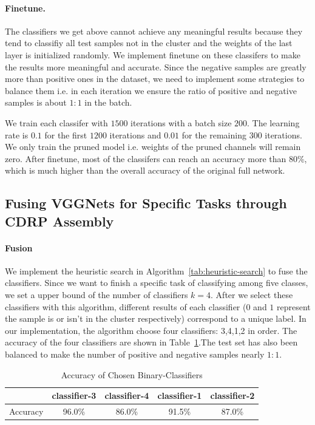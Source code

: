 \documentclass[sigplan,10pt,review]{acmart}\settopmatter{printfolios=true,printccs=false,printacmref=false}
\begin{document}
\paragraph{Finetune.} The classifiers we get above cannot achieve any meaningful results because they tend to classifiy all test samples not in the cluster and the weights of the last layer is initialized randomly.
We implement finetune on these classifers to make the results more meaningful and accurate. 
Since the negative samples are greatly more than positive ones in the dataset, we need to implement some strategies to balance them i.e. in each iteration we ensure the ratio of positive and negative samples is about $1:1$ in the batch.

We train each classifer with $1500$ iterations with a batch size $200$. 
The learning rate is $0.1$ for the first $1200$ iterations and $0.01$ for the remaining $300$ iterations. 
We only train the pruned model i.e. weights of the pruned channels will remain zero.
After finetune, most of the classifers can reach an accuracy more than 80\%, which is much higher than the overall accuracy of the original full network.
 

 
\subsection{Fusing VGGNets for Specific Tasks through CDRP Assembly}
\paragraph{Fusion} We implement the heuristic search in Algorithm~\ref{tab:heuristic-search} to fuse the classifiers. 
Since we want to finish a specific task of classifying among five classes, we set a upper bound of the number of classifiers $k=4$. 
After we select these classifiers with this algorithm, different results of each classifier ($0$ and $1$ represent the sample is or isn't in the cluster respectively) correspond to a unique label.
In our implementation, the algorithm choose four classifiers: 3,4,1,2 in order. 
The accuracy of the four classifiers are shown in Table~\ref{tab:classifer-accuracy}.The test set has also been balanced to make the number of positive and negative samples nearly $1:1$. 

\begin{table}[!htp]
	\begin{tabular}{|c|c|c|c|c|}
	\hline
	& classifier-3 & classifier-4 & classifier-1 & classifier-2 \\
	\hline
	Accuracy & 96.0\% & 86.0\% & 91.5\% & 87.0\%\\
	\hline
	\end{tabular}
    \caption{Accuracy of Chosen Binary-Classifiers}
    \label{tab:classifer-accuracy}
\end{table}
\end{document}

